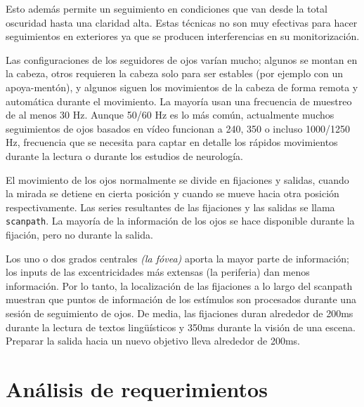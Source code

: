\documentclass[12pt]{article} %
\begin{document}
             Esto además permite un seguimiento en condiciones que van desde la total oscuridad hasta una claridad alta. Estas técnicas no 
             son muy efectivas para hacer seguimientos en exteriores ya que se producen interferencias en su monitorización.
             
             Las configuraciones de los seguidores de ojos varían mucho; algunos se montan en la cabeza, otros requieren la cabeza solo para
             ser estables (por ejemplo con un apoya-mentón), y algunos siguen los movimientos de la cabeza de forma remota y automática
             durante el movimiento. La mayoría usan una frecuencia de muestreo de al menos 30 Hz. Aunque 50/60 Hz es lo más común, actualmente
             muchos seguimientos de ojos basados en vídeo funcionan a 240, 350 o incluso 1000/1250 Hz, frecuencia que se necesita para captar
             en detalle los rápidos movimientos durante la lectura o durante los estudios de neurología.
             
             El movimiento de los ojos normalmente se divide en fijaciones y salidas, cuando la mirada se detiene en cierta posición y cuando
             se mueve hacia otra posición respectivamente. Las series resultantes de las fijaciones y las salidas se llama \texttt{scanpath}.
             La mayoría de la información de los ojos se hace disponible durante la fijación, pero no durante la salida.
             
              Los uno o dos grados centrales \textit{(la fóvea)} aporta la mayor parte de información; los inputs de las excentricidades más
              extensas (la periferia) dan menos información. Por lo tanto, la localización de las fijaciones a lo largo del scanpath muestran
              que puntos de información de los estímulos son procesados durante una sesión de seguimiento de ojos. De media, las fijaciones 
              duran alrededor de 200ms durante la lectura de textos lingüísticos y 350ms durante la visión de una escena. Preparar la 
              salida hacia un nuevo objetivo lleva alrededor de 200ms.
              
\section{Análisis de requerimientos}
\end{document}
